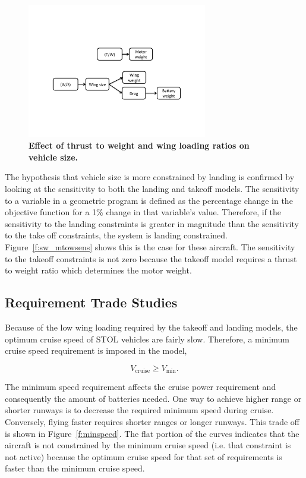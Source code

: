 \documentclass[]{aiaa-tc}%
\begin{document}
\begin{figure}[h!]
	\begin{center}
	\includegraphics[width=0.7\textwidth]{to_land_arg.pdf}
    \caption{\textbf{Effect of thrust to weight and wing loading ratios on vehicle size.}}
	\label{f:to_land_arg}
	\end{center}
\end{figure}

The hypothesis that vehicle size is more constrained by landing is confirmed by looking at the sensitivity to both the landing and takeoff models. 
The sensitivity to a variable in a geometric program is defined as the percentage change in the objective function for a 1\% change in that variable's value.  
Therefore, if the sensitivity to the landing constraints is greater in magnitude than the sensitivity to the take off constraints, the system is landing constrained.  
Figure~\ref{f:sw_mtowsens} shows this is the case for these aircraft.
The sensitivity to the takeoff constraints is not zero because the takeoff model requires a thrust to weight ratio which determines the motor weight. 


\subsection{Requirement Trade Studies}

Because of the low wing loading required by the takeoff and landing models, the optimum cruise speed of STOL vehicles are fairly slow.
Therefore, a minimum cruise speed requirement is imposed in the model,

\begin{equation}
    V_{\mathrm{cruise}} \geq V_{\mathrm{min}}.
\end{equation}

The minimum speed requirement affects the cruise power requirement and consequently the amount of batteries needed.  
One way to achieve higher range or shorter runways is to decrease the required minimum speed during cruise.  
Conversely, flying faster requires shorter ranges or longer runways.
This trade off is shown in Figure~\ref{f:minspeed}.
The flat portion of the curves indicates that the aircraft is not constrained by the minimum cruise speed (i.e. that constraint is not active) because the optimum cruise speed for that set of requirements is faster than the minimum cruise speed. 
\end{document}
